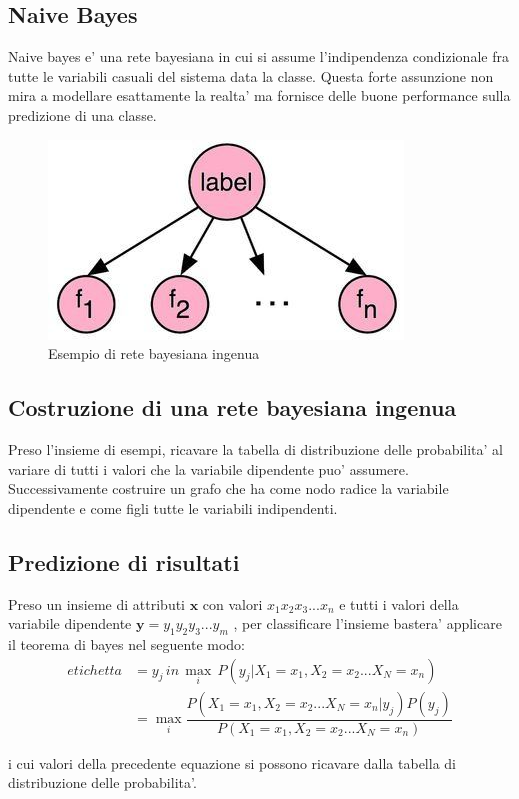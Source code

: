 \subsection*{Naive Bayes}
Naive bayes e' una rete bayesiana in cui si assume l'indipendenza condizionale fra tutte le variabili casuali del sistema data la classe. Questa forte assunzione non mira a modellare esattamente la realta' ma fornisce delle buone performance sulla predizione di una classe.

\begin{figure}[H]
	\centering
	\includegraphics[width=0.4\linewidth]{img/naive_bayes_example}
	\caption{Esempio di rete bayesiana ingenua}
	\label{fig:naivebayesexample}
\end{figure}

\subsection*{Costruzione di una rete bayesiana ingenua}
Preso l'insieme di esempi, ricavare la tabella di distribuzione delle probabilita' al variare di tutti i valori che la variabile dipendente puo' assumere. Successivamente costruire un grafo che ha come nodo radice la variabile dipendente e come figli tutte le variabili indipendenti.
\medskip
\subsection*{Predizione di risultati}
Preso un insieme di attributi $\textbf{x}$ con valori $x_1x_2x_3...x_n$ e tutti i valori della variabile dipendente $\textbf{y}=y_1y_2y_3...y_m$ , per classificare l'insieme bastera' applicare il teorema di bayes nel seguente modo:\\
\begin{align*}
		etichetta &=y_j \, in \, \max_i\,P(y_j|X_1=x_1, X_2=x_2...X_N=x_n) \\
		&= \max_i \dfrac{P(X_1=x_1,X_2=x_2...X_N=x_n|y_j)P(y_j)}{P(X_1=x_1, X_2=x_2...X_N=x_n)}
\end{align*}

i cui valori della precedente equazione si possono ricavare dalla tabella di distribuzione delle probabilita'.

